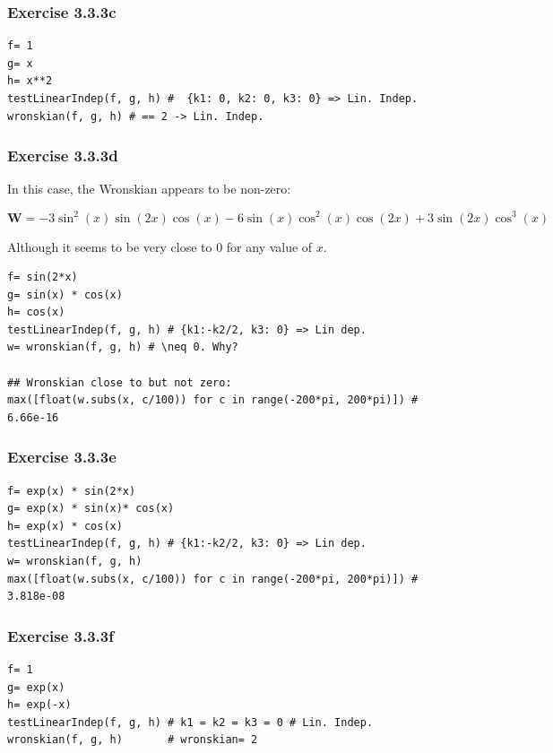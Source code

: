 \subsubsection{Exercise 3.3.3c}
\begin{verbatim}
f= 1
g= x
h= x**2
testLinearIndep(f, g, h) #  {k1: 0, k2: 0, k3: 0} => Lin. Indep.
wronskian(f, g, h) # == 2 -> Lin. Indep.
\end{verbatim}

\subsubsection{Exercise 3.3.3d}

In this case, the Wronskian appears to be non-zero:

$$
\mathbf{W}= - 3 \sin^{2}{\left (x \right )} \sin{\left (2 x \right )}
\cos{\left (x \right )} - 6 \sin{\left (x \right )} \cos^{2}{\left (x \right )}
\cos{\left (2 x \right )} + 3 \sin{\left (2 x \right )} \cos^{3}{\left (x \right )}
$$

Although it seems to be very close to 0 for any value of $x$.

\begin{verbatim}
f= sin(2*x)
g= sin(x) * cos(x)
h= cos(x)
testLinearIndep(f, g, h) # {k1:-k2/2, k3: 0} => Lin dep.
w= wronskian(f, g, h) # \neq 0. Why?

## Wronskian close to but not zero:
max([float(w.subs(x, c/100)) for c in range(-200*pi, 200*pi)]) # 6.66e-16
\end{verbatim}

\subsubsection{Exercise 3.3.3e}

\begin{verbatim}
f= exp(x) * sin(2*x)
g= exp(x) * sin(x)* cos(x)
h= exp(x) * cos(x)
testLinearIndep(f, g, h) # {k1:-k2/2, k3: 0} => Lin dep.
w= wronskian(f, g, h)
max([float(w.subs(x, c/100)) for c in range(-200*pi, 200*pi)]) # 3.818e-08
\end{verbatim}

\subsubsection{Exercise 3.3.3f}
\begin{verbatim}
f= 1
g= exp(x)
h= exp(-x)
testLinearIndep(f, g, h) # k1 = k2 = k3 = 0 # Lin. Indep.
wronskian(f, g, h)       # wronskian= 2
\end{verbatim}

